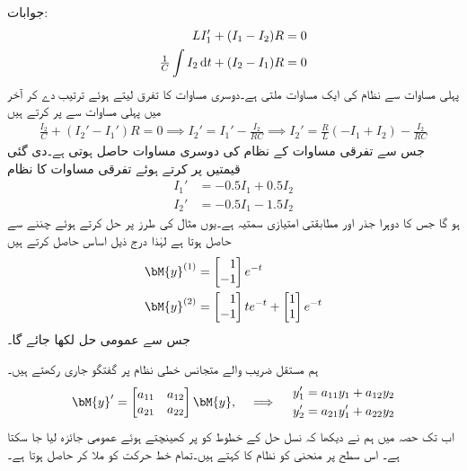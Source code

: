 جوابات:
\begin{align*}
LI_1'+(I_1-I_2)R&=0\\
\tfrac{1}{C}\int I_2 \dif t+(I_2-I_1)R&=0
\end{align*}
پہلی مساوات سے نظام کی ایک مساوات  ملتی ہے۔دوسری مساوات کا تفرق لیتے ہوئے ترتیب دے کر آخر میں پہلی مساوات سے  پر کرتے ہیں
\begin{align*}
\frac{I_2}{C}+(I_2'-I_1')R=0 \implies I_2'=I_1'-\frac{I_2}{RC} \implies  I_2'=\frac{R}{L}(-I_1+I_2)-\frac{I_2}{RC}
\end{align*}
جس سے تفرقی مساوات کے نظام کی دوسری مساوات  حاصل ہوتی ہے۔دی گئی قیمتیں پر کرتے ہوئے تفرقی مساوات کا نظام 
\begin{align*}
I_1'&=-0.5I_1+0.5I_2\\
I_2'&=-0.5I_1-1.5I_2
\end{align*}
ہو گا جس کا دوہرا جذر  اور مطابقتی امتیازی سمتیہ  ہے۔یوں مثال  کی طرز پر  حل کرتے ہوئے  چننے سے  حاصل ہوتا ہے لہٰذا درج ذیل اساس حاصل کرتے ہیں
\begin{align*}
\bM{y}^{(1)}&=\begin{bmatrix*}[r] 1\\ -1 \end{bmatrix*} e^{-t}\\
\bM{y}^{(2)}&=\begin{bmatrix*}[r] 1\\ -1 \end{bmatrix*} te^{-t}+\begin{bmatrix} 1\\1 \end{bmatrix}e^{-t}
\end{align*}
جس سے  عمومی حل  لکھا جائے گا۔

ہم مستقل  ضریب  والے متجانس خطی نظام  پر گفتگو جاری رکھتے ہیں۔
\begin{gather}\label{مساوات_نظام_جانچ_نقطہ_فاصل_الف}
\begin{aligned}
\bM{y}'=\begin{bmatrix} a_{11} & a_{12} \\ a_{21} & a_{22} \end{bmatrix} \bM{y}
\end{aligned}, \quad \implies \quad 
\begin{aligned}
y_1'&=a_{11}y_1+a_{12}y_2\\
y_2'&=a_{21}y_1'+a_{22}y_2
\end{aligned}
\end{gather}
اب تک  حصہ  میں ہم نے دیکھا کہ نسل حل  کے خطوط کو   پر کھینچتے ہوئے عمومی جائزہ لیا جا سکتا ہے۔ اس سطح پر منحنی کو نظام  کا  کہتے ہیں۔تمام خط حرکت کو ملا کر  حاصل ہوتا ہے۔

